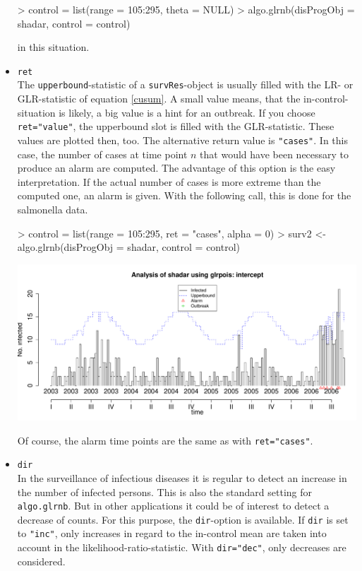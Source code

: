 \documentclass[a4paper,11pt]{article}
\begin{document}
\begin{itemize}
\begin{Schunk}
\begin{Sinput}
> control = list(range = 105:295, theta = NULL)
> algo.glrnb(disProgObj = shadar, control = control)
\end{Sinput}
\end{Schunk}

in this situation.

\item \verb+ret+ \\
The \verb+upperbound+-statistic of a \verb+survRes+-object is usually filled with the LR- or GLR-statistic of equation \ref{cusum}. A small value means, that the in-control-situation is likely, a big value is a hint for an outbreak. If you choose \verb+ret="value"+, the upperbound slot is filled with the GLR-statistic. These values are plotted then, too. The alternative return value is \verb+"cases"+. In this case, the number of cases at time point $n$ that would have been necessary to produce an alarm are computed. The advantage of this option is the easy interpretation. If the actual number of cases is more extreme than the computed one, an alarm is given. With the following call, this is done for the salmonella data.

\begin{Schunk}
\begin{Sinput}
> control = list(range = 105:295, ret = "cases", alpha = 0)
> surv2 <- algo.glrnb(disProgObj = shadar, control = control)
\end{Sinput}
\end{Schunk}

\includegraphics{figs/vignette_glrnb-021}

Of course, the alarm time points are the same as with \verb+ret="cases"+.

\item \verb+dir+ \\
In the surveillance of infectious diseases it is regular to detect an increase in the number of infected persons. This is also the standard setting for \verb+algo.glrnb+. But in other applications it could be of interest to detect a decrease of counts. For this purpose, the \verb+dir+-option is available. If \verb+dir+ is set to \verb+"inc"+, only increases in regard to the in-control mean are taken into account in the likelihood-ratio-statistic. With \verb+dir="dec"+, only decreases are considered.


\end{itemize}
\end{document}
